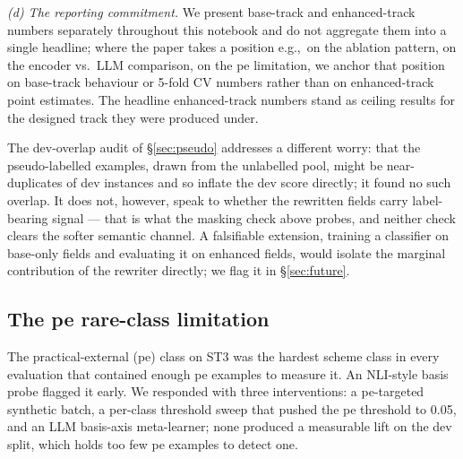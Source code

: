 \emph{(d) The reporting commitment.} We present base-track and enhanced-track numbers separately throughout this notebook and do not aggregate them into a single headline; where the paper takes a position e.g.,\ on the ablation pattern, on the encoder vs.\ LLM comparison, on the \textsf{pe} limitation, we anchor that position on base-track behaviour or 5-fold CV numbers rather than on enhanced-track point estimates. The headline enhanced-track numbers stand as ceiling results for the designed track they were produced under.

The dev-overlap audit of \S\ref{sec:pseudo} addresses a different worry: that the pseudo-labelled examples, drawn from the unlabelled pool, might be near-duplicates of dev instances and so inflate the dev score directly; it found no such overlap. %
It does not, however, speak to whether the rewritten fields carry label-bearing signal --- that is what the masking check above probes, and neither check clears the softer semantic channel. A falsifiable extension, training a classifier on base-only fields and evaluating it on enhanced fields, would isolate the marginal contribution of the rewriter directly; we flag it in \S\ref{sec:future}.

\subsection{The \textsf{pe} rare-class limitation}
\label{sec:disc-pe}

The practical-external (\textsf{pe}) class on ST3 was the hardest scheme class in every evaluation that contained enough \textsf{pe} examples to measure it. An NLI-style basis probe flagged it early. %
We responded with three interventions: a \textsf{pe}-targeted synthetic batch, a per-class threshold sweep that pushed the \textsf{pe} threshold to 0.05, and an LLM basis-axis meta-learner; none produced a measurable lift on the dev split, which holds too few \textsf{pe} examples to detect one. %

